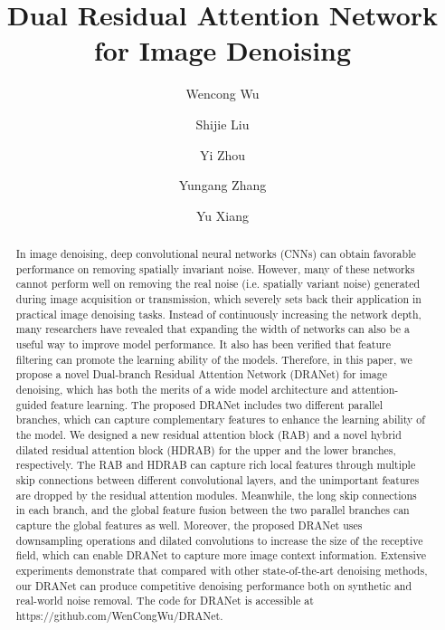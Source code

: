 \documentclass[3p,times]{elsarticle}
\begin{document}
\begin{frontmatter}
\title {Dual Residual Attention Network for Image Denoising}

\author[mymainaddress]{Wencong Wu}

\author[mymainaddress]{Shijie Liu}

\author[mymainaddress]{Yi Zhou}

\author[mymainaddress]{Yungang Zhang}

\author[mymainaddress]{Yu Xiang}


\address[mymainaddress]{School of Information Science and Technology, Yunnan Normal University, Kunming 650500, Yunnan Province, China}

\begin{abstract}
In image denoising, deep convolutional neural networks (CNNs) can obtain favorable performance on removing spatially invariant noise. However, many of these networks cannot perform well on removing the real noise (i.e. spatially variant noise) generated during image acquisition or transmission, which severely sets back their application in practical image denoising tasks. Instead of continuously increasing the network depth, many researchers have revealed that expanding the width of networks can also be a useful way to improve model performance. It also has been verified that feature filtering can promote the learning ability of the models. Therefore, in this paper, we propose a novel Dual-branch Residual Attention Network (DRANet) for image denoising, which has both the merits of a wide model architecture and attention-guided feature learning. The proposed DRANet includes two different parallel branches, which can capture complementary features to enhance the learning ability of the model. We designed a new residual attention block (RAB) and a novel hybrid dilated residual attention block (HDRAB) for the upper and the lower branches, respectively. The RAB and HDRAB can capture rich local features through multiple skip connections between different convolutional layers, and the unimportant features are dropped by the residual attention modules. Meanwhile, the long skip connections in each branch, and the global feature fusion between the two parallel branches can capture the global features as well. Moreover, the proposed DRANet uses downsampling operations and dilated convolutions to increase the size of the receptive field, which can enable DRANet to capture more image context information. Extensive experiments demonstrate that compared with other state-of-the-art denoising methods, our DRANet can produce competitive denoising performance both on synthetic and real-world noise removal. The code for DRANet is accessible at https://github.com/WenCongWu/DRANet.
\end{abstract}


\end{frontmatter}
\end{document}

